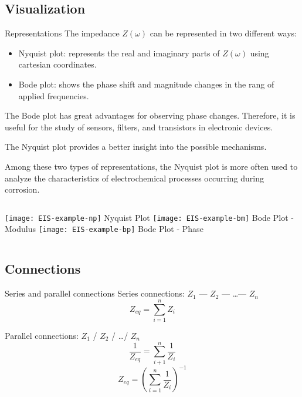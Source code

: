 \documentclass[10pt,compress,handout]{beamer}
\begin{document}
    \subsection{Visualization}
    \begin{frame}[allowframebreaks=1.0]{Representations}
        The impedance $Z(\omega)$ can be represented in two different ways:
        \begin{itemize}
            \item  Nyquist plot: represents the real and imaginary parts of $Z(\omega)$ using cartesian coordinates.
            \item  Bode plot: shows the phase shift and magnitude changes in the rang of applied frequencies.
        \end{itemize}
    
        The Bode plot has great advantages for observing phase changes. 
        Therefore, it is useful for the study of sensors, filters, and transistors in electronic devices.
        
        The Nyquist plot provides a better insight into the possible mechanisms.

        \framebreak
        Among these two types of representations, the Nyquist plot is more often used to analyze the characteristics of
        electrochemical processes occurring during corrosion.
        \begin{columns}
            \centering
                \centering
                \texttt{[image: EIS-example-np]}
                Nyquist Plot
                \centering
                \texttt{[image: EIS-example-bm]}
                Bode Plot - Modulus
                \centering
                \texttt{[image: EIS-example-bp]}
                Bode Plot - Phase
        \end{columns}
    \end{frame}
    
    \subsection{Connections}
    \begin{frame}{Series and parallel connections}
        Series connections: $Z_1$ --- $Z_2$ --- \ldots --- $Z_n$
        $$ Z_{eq} = \sum _{i=1}^n Z_i $$

        Parallel connections: $Z_1$ / $Z_2$ / \ldots / $Z_n$ 
        $$ \frac{1}{Z_{eq}} = \sum _{i+1}^n \frac{1}{Z_i} $$
        $$ Z_{eq} = \left( \sum _{i=1}^n \frac{1}{Z_i} \right)^{-1} $$
    \end{frame}
\end{document}
